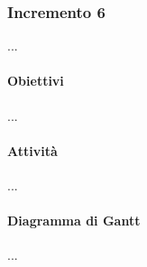 \subsubsection{Incremento 6}
...
\paragraph{Obiettivi}
...
\paragraph{Attività}
...
\paragraph{Diagramma di Gantt}
...

